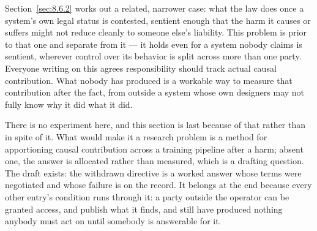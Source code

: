 Section~\ref{sec:8.6.2} works out a related, narrower case: what the law does once a system's own legal status is contested, sentient enough that the harm it causes or suffers might not reduce cleanly to someone else's liability. This problem is prior to that one and separate from it — it holds even for a system nobody claims is sentient, wherever control over its behavior is split across more than one party. Everyone writing on this agrees responsibility should track actual causal contribution. What nobody has produced is a workable way to measure that contribution after the fact, from outside a system whose own designers may not fully know why it did what it did.

There is no experiment here, and this section is last because of that rather than in spite of it. What would make it a research problem is a method for apportioning causal contribution across a training pipeline after a harm; absent one, the answer is allocated rather than measured, which is a drafting question. The draft exists: the withdrawn directive is a worked answer whose terms were negotiated and whose failure is on the record. It belongs at the end because every other entry's condition runs through it: a party outside the operator can be granted access, and publish what it finds, and still have produced nothing anybody must act on until somebody is answerable for it.
